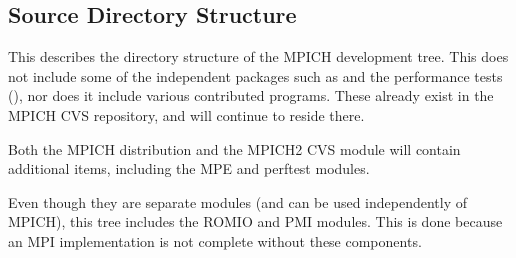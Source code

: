 \documentclass{article}
\begin{document}
\subsection{Source Directory Structure}
\label{sec:dir-structure}
This describes the directory structure of the MPICH development tree. 
This does not include some of the independent packages such as  and
the performance tests (), nor does it include various
contributed programs.  These already exist in the MPICH CVS repository, and
will continue to reside there.

Both the MPICH distribution and the MPICH2 CVS module will contain additional
items, including the MPE and perftest modules.  

Even though they are separate modules (and can be used independently
of MPICH), this tree includes the ROMIO and PMI modules.  This is done
because an MPI implementation is not complete without these components.
\end{document}
